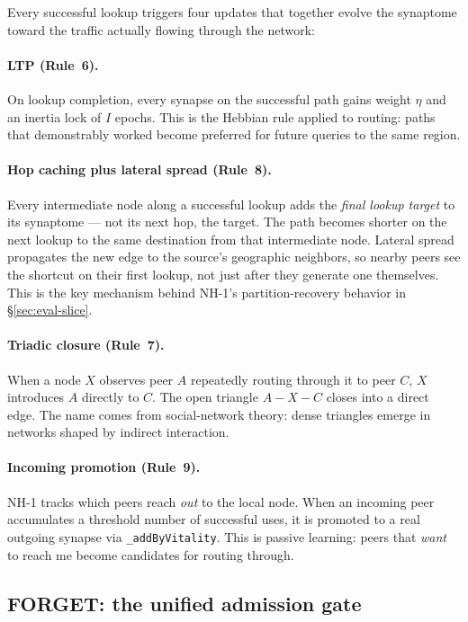 \documentclass[conference]{IEEEtran}
\newcommand{\nhone}{NH-1\xspace}
\begin{document}
Every successful lookup triggers four updates that together evolve the
synaptome toward the traffic actually flowing through the network:

\paragraph{LTP (Rule~6).}
On lookup completion, every synapse on the successful path gains weight
$\eta$ and an inertia lock of $I$ epochs. This is the Hebbian rule applied
to routing: paths that demonstrably worked become preferred for future
queries to the same region.

\paragraph{Hop caching plus lateral spread (Rule~8).}
Every intermediate node along a successful lookup adds the
\emph{final lookup target} to its synaptome --- not its next hop, the
target. The path becomes shorter on the next lookup to the same
destination from that intermediate node. Lateral spread propagates the
new edge to the source's geographic neighbors, so nearby peers see the
shortcut on their first lookup, not just after they generate one
themselves. This is the key mechanism behind \nhone's partition-recovery
behavior in \S\ref{sec:eval-slice}.

\paragraph{Triadic closure (Rule~7).}
When a node $X$ observes peer $A$ repeatedly routing through it to peer
$C$, $X$ introduces $A$ directly to $C$. The open triangle
$A \!-\! X \!-\! C$ closes into a direct edge. The name comes from
social-network theory: dense triangles emerge in networks shaped by
indirect interaction.

\paragraph{Incoming promotion (Rule~9).}
\nhone tracks which peers reach \emph{out} to the local node. When an
incoming peer accumulates a threshold number of successful uses, it is
promoted to a real outgoing synapse via \texttt{\_addByVitality}. This is
passive learning: peers that \emph{want} to reach me become candidates
for routing through.

\subsection{FORGET: the unified admission gate}
\label{sec:nh1-forget}
\end{document}
